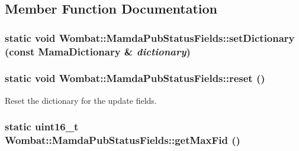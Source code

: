 \subsection{Member Function Documentation}
\hypertarget{classWombat_1_1MamdaPubStatusFields_0244fb3aa4d6a3696bb88ecbdc4089b7}{
\subsubsection[setDictionary]{\setlength{\rightskip}{0pt plus 5cm}static void Wombat::Mamda\-Pub\-Status\-Fields::set\-Dictionary (const Mama\-Dictionary \& {\em dictionary})}}
\label{classWombat_1_1MamdaPubStatusFields_0244fb3aa4d6a3696bb88ecbdc4089b7}


\hypertarget{classWombat_1_1MamdaPubStatusFields_1753a8e03e77d1bbda5d8a9c773ec855}{
\subsubsection[reset]{\setlength{\rightskip}{0pt plus 5cm}static void Wombat::Mamda\-Pub\-Status\-Fields::reset ()}}
\label{classWombat_1_1MamdaPubStatusFields_1753a8e03e77d1bbda5d8a9c773ec855}


Reset the dictionary for the update fields. 

\hypertarget{classWombat_1_1MamdaPubStatusFields_06eeef5552c871dab84a2a4198b733de}{
\subsubsection[getMaxFid]{\setlength{\rightskip}{0pt plus 5cm}static uint16\_\-t Wombat::Mamda\-Pub\-Status\-Fields::get\-Max\-Fid ()}}
\label{classWombat_1_1MamdaPubStatusFields_06eeef5552c871dab84a2a4198b733de}


